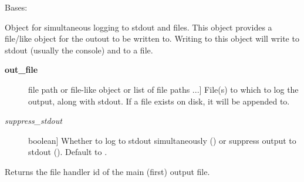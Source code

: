 \documentclass[a4paper,10pt,english]{sphinxmanual}
\begin{document}
\begin{fulllineitems}
\label{index:kafe.stream.StreamDup}
Bases: 

Object for simultaneous logging to stdout and files.
This object provides a file/like object for the outout to be written to.
Writing to this object will write to stdout (usually the console) and to
a file.
\begin{description}
\item[{\textbf{out\_file}}] \leavevmode{[}file path or file-like object or list of file paths ...{]}
File(s) to which to log the output, along with stdout. If a file exists
on disk, it will be appended to.

\item[{\emph{suppress\_stdout}}] \leavevmode{[}boolean{]}
Whether to log to stdout simultaneously () or suppress output
to stdout (). Default to .

\end{description}

\begin{fulllineitems}
\label{index:kafe.stream.StreamDup.fileno}
Returns the file handler id of the main (first) output file.

\end{fulllineitems}


\begin{fulllineitems}
\label{index:kafe.stream.StreamDup.flush}
\end{fulllineitems}


\begin{fulllineitems}
\label{index:kafe.stream.StreamDup.write}
\end{fulllineitems}


\begin{fulllineitems}
\label{index:kafe.stream.StreamDup.write_timestamp}
\end{fulllineitems}


\end{fulllineitems}
\end{document}

